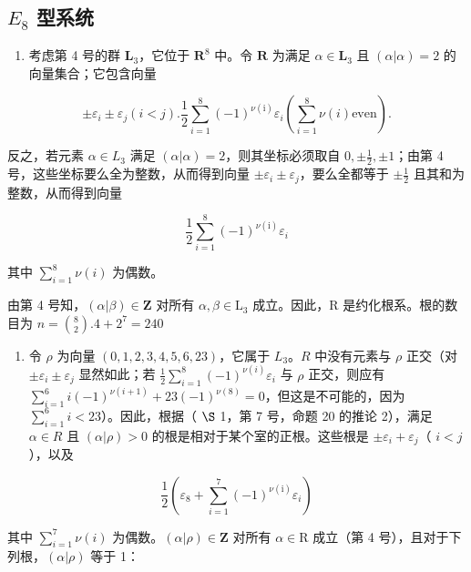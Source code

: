 \subsection{\texorpdfstring{\(E_{8}\) 型系统}{E\_8 型系统}}

\begin{enumerate}
\def\labelenumi{(\Roman{enumi})}
\tightlist
\item
  考虑第 4 号的群 \(\mathbf{L}_3\)，它位于 \(\mathbf{R}^8\) 中。令 \(\mathbf{R}\) 为满足 \(\alpha \in \mathbf{L}_3\) 且 \((\alpha |\alpha) = 2\) 的向量集合；它包含向量
\end{enumerate}

\[
\pm \varepsilon_ {i} \pm \varepsilon_ {j} (i <   j). \frac {1}{2} \sum_ {i = 1} ^ {8} (- 1) ^ {\nu (\mathrm{i})} \varepsilon_ {i} \left(\sum_ {i = 1} ^ {8} \nu (i) \text {even}\right).
\]

反之，若元素 \(\alpha \in L_3\) 满足 \((\alpha |\alpha) = 2\)，则其坐标必须取自 \(0, \pm \frac{1}{2}, \pm 1\)；由第 4 号，这些坐标要么全为整数，从而得到向量 \(\pm \varepsilon_i \pm \varepsilon_j\)，要么全都等于 \(\pm \frac{1}{2}\) 且其和为整数，从而得到向量

\[
\frac {1}{2} \sum_ {i = 1} ^ {8} (- 1) ^ {\nu (\mathrm{i})} \varepsilon_ {i}
\]

其中 \(\sum_{i=1}^{8} \nu(i)\) 为偶数。

  由第 4 号知，\((\alpha |\beta)\in \mathbf{Z}\) 对所有 \(\alpha ,\beta \in \mathrm{L}_3\) 成立。因此，R 是约化根系。根的数目为 \(n = \binom{8}{2}.4 + 2^7 = 240\)

\begin{enumerate}
\def\labelenumi{(\Roman{enumi})}
\setcounter{enumi}{1}
\tightlist
\item
  令 \(\rho\) 为向量 \((0,1,2,3,4,5,6,23)\)，它属于 \(L_{3}\)。\(R\) 中没有元素与 \(\rho\) 正交（对 \(\pm \varepsilon_{i} \pm \varepsilon_{j}\) 显然如此；若 \(\frac{1}{2} \sum_{i=1}^{8} (-1)^{\nu(i)} \varepsilon_{i}\) 与 \(\rho\) 正交，则应有 \(\sum_{i=1}^{6} i(-1)^{\nu(i+1)} + 23(-1)^{\nu(8)} = 0\)，但这是不可能的，因为 \(\sum_{i=1}^{6} i < 23\)）。因此，根据（ \(\S\) 1，第 7 号，命题 20 的推论 2），满足 \(\alpha \in R\) 且 \((\alpha | \rho) > 0\) 的根是相对于某个室的正根。这些根是 \(\pm \varepsilon_{i} + \varepsilon_{j}\)（ \(i < j\)），以及
\end{enumerate}

\[
\frac {1}{2} \left(\varepsilon_ {8} + \sum_ {i = 1} ^ {7} (- 1) ^ {\nu (\mathrm{i})} \varepsilon_ {i}\right)
\]

  其中 \(\sum_{i=1}^{7} \nu(i)\) 为偶数。\((\alpha|\rho) \in \mathbf{Z}\) 对所有 \(\alpha \in \mathrm{R}\) 成立（第 4 号），且对于下列根，\((\alpha|\rho)\) 等于 1：

